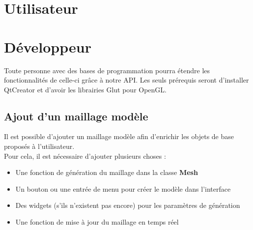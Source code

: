 \documentclass[a4paper]{memoir}
\begin{document}
		\section{Utilisateur}

		\section{Développeur}
			Toute personne avec des bases de programmation pourra étendre les fonctionnalités de celle-ci grâce à notre API. Les seuls prérequis seront 
			d'installer QtCreator et d'avoir les librairies Glut pour OpenGL.
			
			\subsection{Ajout d'un maillage modèle}
				Il est possible d'ajouter un maillage modèle afin d'enrichir les objets de base proposés à l'utilisateur.\\
				Pour cela, il est nécessaire d'ajouter plusieurs choses :
				\begin{itemize}
					\item Une fonction de génération du maillage dans la classe \textbf{Mesh}
					\item Un bouton ou une entrée de menu pour créer le modèle dans l'interface
					\item Des widgets (s'ils n'existent pas encore) pour les paramètres de génération
					\item Une fonction de mise à jour du maillage en temps réel
				\end{itemize}
				
\end{document}
